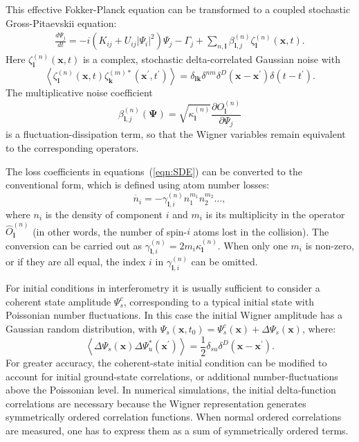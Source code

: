 \documentclass[aps,prl,twocolumn,showpacs,amsmath,amssymb,superscriptaddress,flushbottom,noraggedfooter]{revtex4-1}
\newcommand{\xvec}{\boldsymbol{x}}
\newcommand{\kvec}{\boldsymbol{k}}
\newcommand{\lvec}{\boldsymbol{l}}
\newcommand{\Psivec}{\boldsymbol{\Psi}}
\begin{document}
This effective Fokker-Planck equation can be transformed
to a coupled stochastic Gross-Pitaevskii equation:
\begin{equation}
\label{eqn:SDE}
\begin{split}
	\frac{d\Psi_{j}}{dt} = -i \left(
		K_{ij} + U_{ij} \lvert \Psi_{i} \rvert ^{2}
	\right) \Psi_{j} - \Gamma_{j} +
	\sum_{n,\lvec} \beta_{\lvec,j}^{(n)} \zeta_{\lvec}^{(n)} (\xvec,t).
\end{split}
\end{equation}
Here $\zeta_{\lvec}^{(n)}(\xvec, t)$ is a complex,
stochastic delta-correlated Gaussian noise with
\begin{equation}
	\left\langle
		\zeta_{\lvec}^{(n)} (\xvec,t) \zeta_{\kvec}^{(m)*}(\xvec^\prime, t^\prime)
	\right\rangle =
	\delta_{\lvec \kvec} \delta^{nm} \delta^{D} \left(
		\xvec - \xvec^\prime
	\right)
	\delta \left( t - t^\prime \right).
\end{equation}
The multiplicative noise coefficient
\begin{equation}
	\beta_{\lvec,j}^{(n)} \left( \Psivec \right) =
	\sqrt{\kappa_{\lvec}^{(n)}}
	\frac{\partial O_{\lvec}^{(n)}}{\partial\Psi_{j}}
\end{equation}
is a fluctuation-dissipation term,
so that the Wigner variables remain equivalent to the corresponding operators.

The loss coefficients in equations~(\ref{eqn:SDE}) can be converted to the conventional form,
which is defined using atom number losses:
\begin{equation}
	\dot{n_i} = - \gamma^{(n)}_{\lvec,i} n^{m_1}_1 n^{m_2}_2 \ldots ,
\end{equation}
where $n_i$ is the density of component $i$ and $m_i$
is its multiplicity in the operator $\hat{O}^{(n)}_{\lvec}$
(in other words, the number of spin-$i$ atoms lost in the collision).
The conversion can be carried out as $\gamma^{(n)}_{\lvec,i} = 2 m_i \kappa^{(n)}_{\lvec}$.
When only one $m_i$ is non-zero, or if they are all equal,
the index $i$ in $\gamma^{(n)}_{\lvec,i}$ can be omitted.

For initial conditions in interferometry it is usually sufficient
to consider a coherent state amplitude $\Psi_{s}^{c}$,
corresponding to a typical initial state with Poissonian number fluctuations.
In this case the initial Wigner amplitude has a Gaussian random distribution,
with $\Psi_{s}(\xvec,t_{0})=\Psi_{s}^{c}(\xvec)+\Delta\Psi_{s}(\xvec)$,
where:
\begin{equation}
	\left\langle
		\Delta\Psi_{s}(\xvec) \Delta\Psi_{u}^{*}(\xvec^\prime)
	\right\rangle =
	\frac{1}{2} \delta_{su} \delta^{D} \left( \xvec - \xvec^\prime\right).
\end{equation}
For greater accuracy, the coherent-state initial condition
can be modified to account for initial ground-state correlations,
or additional number-fluctuations above the Poissonian level.
In numerical simulations, the initial delta-function correlations are necessary
because the Wigner representation generates symmetrically ordered correlation functions. When normal ordered correlations are measured,
one has to express them as a sum of symmetrically ordered terms.
\end{document}
